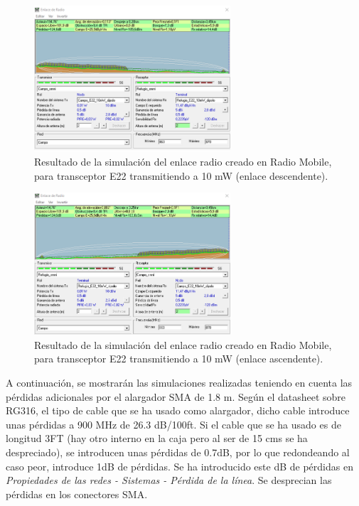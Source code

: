 \documentclass[12pt]{article}
\begin{document}
	\pagebreak
	
	\begin{figure}[h!]
		\begin{center}
			\includegraphics[width=0.65\textwidth]{img/resultado_e22_10mW_desc.png}
			\caption{Resultado de la simulación del enlace radio creado en Radio Mobile, para transceptor E22 transmitiendo a 10 mW (enlace descendente).}
			\label{fig: resultado enlace e22 10mW descendente radio mobile}
		\end{center}
	\end{figure}
	
	
	\begin{figure}[h!]
		\begin{center}
			\includegraphics[width=0.65\textwidth]{img/resultado_e22_10mW_asc.png}
			\caption{Resultado de la simulación del enlace radio creado en Radio Mobile, para transceptor E22 transmitiendo a 10 mW (enlace ascendente).}
			\label{fig: resultado enlace e22 10mW ascendente radio mobile}
		\end{center}
	\end{figure}
	
	\pagebreak
	
	\noindent A continuación, se mostrarán las simulaciones realizadas teniendo en cuenta las pérdidas adicionales por el alargador SMA de 1.8 m. Según el datasheet sobre RG316, el tipo de cable que se ha usado como alargador, dicho cable introduce unas pérdidas a 900 MHz de 26.3 dB/100ft. Si el cable que se ha usado es de longitud 3FT (hay otro interno en la caja pero al ser de 15 cms se ha despreciado), se introducen unas pérdidas de 0.7dB, por lo que redondeando al caso peor, introduce 1dB de pérdidas. Se ha introducido este dB de pérdidas en \textit{Propiedades de las redes - Sistemas - Pérdida de la línea}. Se desprecian las pérdidas en los conectores SMA.\\
	
\end{document}
